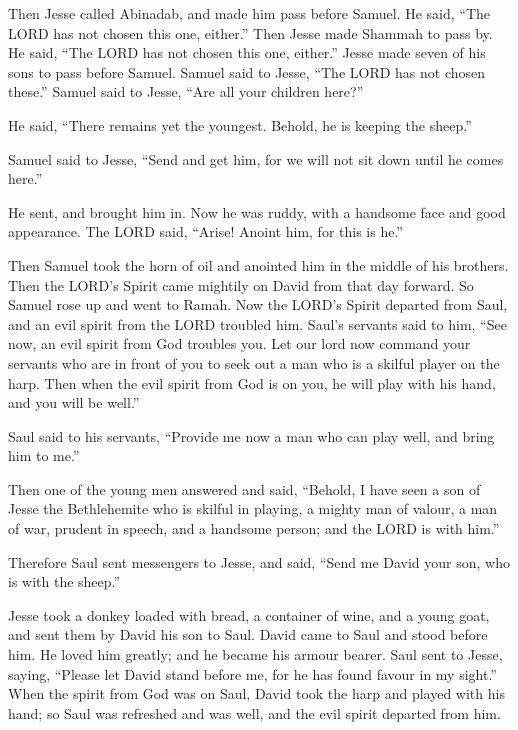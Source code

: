  Then Jesse called Abinadab, and made him pass before
Samuel. He said, ``The LORD has not chosen this one, either.''
 Then Jesse made Shammah to pass by. He said, ``The LORD has
not chosen this one, either.''  Jesse made seven of his
sons to pass before Samuel. Samuel said to Jesse, ``The LORD has not
chosen these.''  Samuel said to Jesse, ``Are all your
children here?''

He said, ``There remains yet the youngest. Behold, he is keeping the
sheep.''

Samuel said to Jesse, ``Send and get him, for we will not sit down until
he comes here.''

 He sent, and brought him in. Now he was ruddy, with a
handsome face and good appearance. The LORD said, ``Arise! Anoint him,
for this is he.''

 Then Samuel took the horn of oil and anointed him in the
middle of his brothers. Then the LORD's Spirit came mightily on David
from that day forward. So Samuel rose up and went to Ramah.
 Now the LORD's Spirit departed from Saul, and an evil
spirit from the LORD troubled him.  Saul's servants said to
him, ``See now, an evil spirit from God troubles you.  Let
our lord now command your servants who are in front of you to seek out a
man who is a skilful player on the harp. Then when the evil spirit from
God is on you, he will play with his hand, and you will be well.''

 Saul said to his servants, ``Provide me now a man who can
play well, and bring him to me.''

 Then one of the young men answered and said, ``Behold, I
have seen a son of Jesse the Bethlehemite who is skilful in playing, a
mighty man of valour, a man of war, prudent in speech, and a handsome
person; and the LORD is with him.''

 Therefore Saul sent messengers to Jesse, and said, ``Send
me David your son, who is with the sheep.''

 Jesse took a donkey loaded with bread, a container of
wine, and a young goat, and sent them by David his son to Saul.
 David came to Saul and stood before him. He loved him
greatly; and he became his armour bearer.  Saul sent to
Jesse, saying, ``Please let David stand before me, for he has found
favour in my sight.''  When the spirit from God was on
Saul, David took the harp and played with his hand; so Saul was
refreshed and was well, and the evil spirit departed from him.

